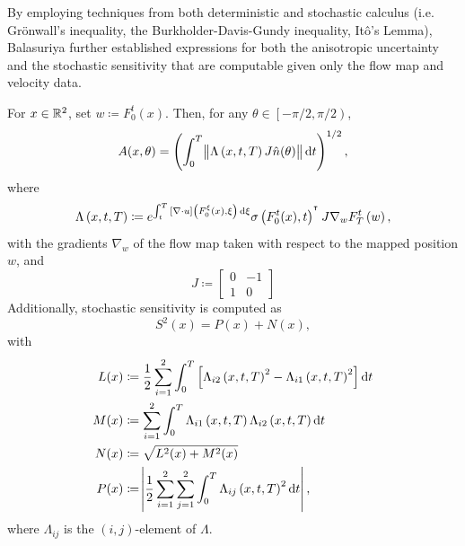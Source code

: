 By employing techniques from both deterministic and stochastic calculus (i.e. Gr\"onwall's inequality, the Burkholder-Davis-Gundy inequality, It\^o's Lemma), Balasuriya further established expressions for both the anisotropic uncertainty and the stochastic sensitivity that are computable given only the flow map and velocity data.

\begin{theorem}\label{thm:orig_s2_calculation}
	For \(x \in \mathbb{R}^2\), set \(w \coloneqq F_0^t(x)\).
	Then, for any \(\theta \in \left[-\pi/2, \pi/2\right)\),
	\[
		A(x,\theta) = \left(\int_0^T{\norm{\Lambda\left(x, t, T\right)J\hat{n}(\theta)}\dif t}\right)^{1/2},
	\]
	where
	\[
		\Lambda\left(x,t,T\right) \coloneqq e^{\int_t^T{\left[\nabla \cdot u\right]\left(F_0^\xi(x), \xi\right)\dif\xi}}\sigma\left(F_0^t(x), t\right)^{\T}J \nabla_w F_T^t\left(w\right),
	\]
	with the gradients \(\nabla_w\) of the flow map taken with respect to the mapped position \(w\), and
	\[
		J \coloneqq \begin{bmatrix}
			0 & -1 \\
			1 & 0
		\end{bmatrix}
	\]
	Additionally, stochastic sensitivity is computed as
	\[
		S^2(x) = P(x) + N(x),
	\]
	with
	\begin{align*}
		L(x) & \coloneqq \frac12\sum_{i=1}^2\int_0^T\left[\Lambda_{i2}\left(x,t, T\right)^2 - \Lambda_{i1}\left(x,t,T\right)^2\right]\dif t \\
		M(x) & \coloneqq \sum_{i=1}^2\int_0^T{\Lambda_{i1}\left(x,t,T\right)\Lambda_{i2}\left(x,t,T\right)\dif t}                           \\
		N(x) & \coloneqq \sqrt{L^2(x) + M^2(x)}                                                                                             \\
		P(x) & \coloneqq \abs{\frac12\sum_{i=1}^2\sum_{j=1}^2{\int_0^T{\Lambda_{ij}\left(x,t,T\right)^2\dif t}}},
	\end{align*}
	where \(\Lambda_{ij}\) is the \((i,j)\)-element of \(\Lambda\).
\end{theorem}




